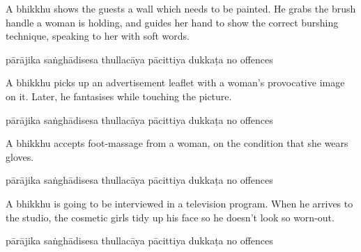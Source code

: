 \begin{exam}{\autoExamName}
\begin{problem*}
\begin{parts}
    \bigskip

  \item A bhikkhu shows the guests a wall which needs to be painted. He grabs the
  brush handle a woman is holding, and guides her hand to show the correct
  burshing technique, speaking to her with soft words.

  \bigskip

  \begin{answers}{6}
    \bChoices
     pārājika\eAns
     saṅghādisesa\eAns
     thullacāya\eAns
     pācittiya\eAns
     dukkaṭa\eAns
     no offences\eAns
    \eChoices
  \end{answers}

  \bigskip

  \item A bhikkhu picks up an advertisement leaflet with a woman's provocative
    image on it. Later, he fantasises while touching the picture.

  \bigskip

  \begin{answers}{6}
    \bChoices
     pārājika\eAns
     saṅghādisesa\eAns
     thullacāya\eAns
     pācittiya\eAns
     dukkaṭa\eAns
     no offences\eAns
    \eChoices
  \end{answers}

  \bigskip

  \item A bhikkhu accepts foot-massage from a woman, on the condition that she wears gloves.

  \bigskip

  \begin{answers}{6}
    \bChoices
     pārājika\eAns
     saṅghādisesa\eAns
     thullacāya\eAns
     pācittiya\eAns
     dukkaṭa\eAns
     no offences\eAns
    \eChoices
  \end{answers}

  \bigskip

  \item A bhikkhu is going to be interviewed in a television program. When he
    arrives to the studio, the cosmetic girls tidy up his face so he doesn't look
    so worn-out.

  \bigskip

  \begin{answers}{6}
    \bChoices
     pārājika\eAns
     saṅghādisesa\eAns
     thullacāya\eAns
     pācittiya\eAns
     dukkaṭa\eAns
     no offences\eAns
    \eChoices
  \end{answers}

  \end{parts}

\end{problem*}

\end{exam}
